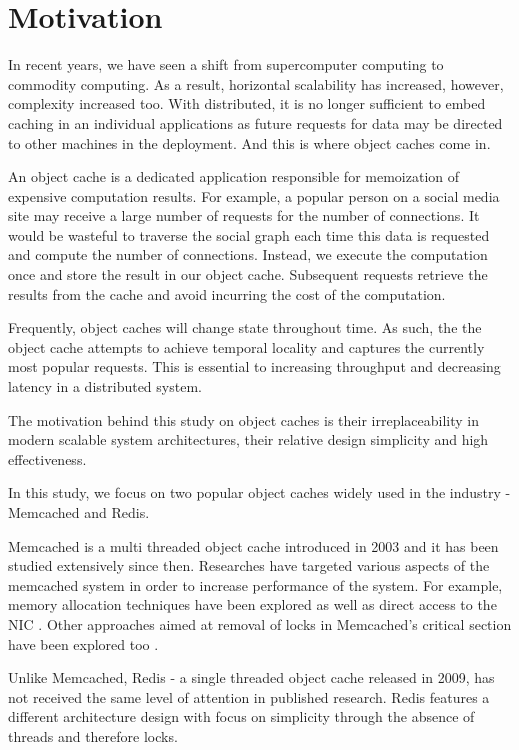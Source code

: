 \section{Motivation}

In recent years, we have seen a shift from supercomputer computing to commodity computing. As a result, horizontal scalability has increased, however, complexity increased too. With distributed, it is no longer sufficient to embed caching in an individual applications as future requests for data may be directed to other machines in the deployment. And this is where object caches come in.

An object cache is a dedicated application responsible for memoization of expensive computation results. For example, a popular person on a social media site may receive a large number of requests for the number of connections. It would be wasteful to traverse the social graph each time this data is requested and compute the number of connections. Instead, we execute the computation once and store the result in our object cache. Subsequent requests retrieve the results from the cache and avoid incurring the cost of the computation.

Frequently, object caches will change state throughout time. As such, the the object cache attempts to achieve temporal locality and captures the currently most popular requests. This is essential to increasing throughput and decreasing latency in a distributed system.

The motivation behind this study on object caches is their irreplaceability in modern scalable system architectures, their relative design simplicity and high effectiveness.

In this study, we focus on two popular object caches widely used in the industry - Memcached and Redis.

Memcached is a multi threaded object cache introduced in 2003 and it has been studied extensively since then. Researches have targeted various aspects of the memcached system in order to increase performance of the system. For example, memory allocation techniques have been explored as well as direct access to the NIC \cite{lim2014mica}. Other approaches aimed at removal of locks in Memcached's critical section have been explored too \cite{wiggins2012enhancing}.

Unlike Memcached, Redis - a single threaded object cache released in 2009, has not received the same level of attention in published research. Redis features a different architecture design with focus on simplicity through the absence of threads and therefore locks.

